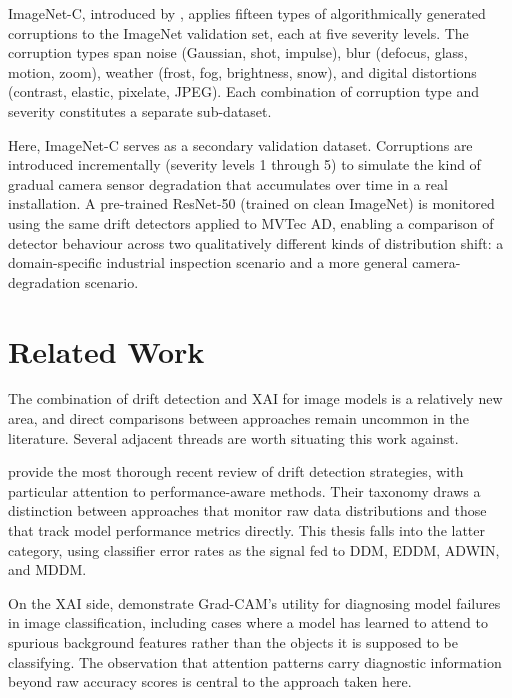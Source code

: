 ImageNet-C, introduced by \textcite{Hendrycks2019}, applies fifteen types of algorithmically generated corruptions to the ImageNet validation set, each at five severity levels. The corruption types span noise (Gaussian, shot, impulse), blur (defocus, glass, motion, zoom), weather (frost, fog, brightness, snow), and digital distortions (contrast, elastic, pixelate, JPEG). Each combination of corruption type and severity constitutes a separate sub-dataset.

Here, ImageNet-C serves as a secondary validation dataset. Corruptions are introduced incrementally (severity levels 1 through 5) to simulate the kind of gradual camera sensor degradation that accumulates over time in a real installation. A pre-trained ResNet-50 (trained on clean ImageNet) is monitored using the same drift detectors applied to MVTec AD, enabling a comparison of detector behaviour across two qualitatively different kinds of distribution shift: a domain-specific industrial inspection scenario and a more general camera-degradation scenario.

\section{Related Work}
\label{sec:relatedwork}

The combination of drift detection and XAI for image models is a relatively new area, and direct comparisons between approaches remain uncommon in the literature. Several adjacent threads are worth situating this work against.

\textcite{Bayram2022} provide the most thorough recent review of drift detection strategies, with particular attention to performance-aware methods. Their taxonomy draws a distinction between approaches that monitor raw data distributions and those that track model performance metrics directly. This thesis falls into the latter category, using classifier error rates as the signal fed to DDM, EDDM, ADWIN, and MDDM.

On the XAI side, \textcite{Selvaraju2019} demonstrate Grad-CAM's utility for diagnosing model failures in image classification, including cases where a model has learned to attend to spurious background features rather than the objects it is supposed to be classifying. The observation that attention patterns carry diagnostic information beyond raw accuracy scores is central to the approach taken here.

